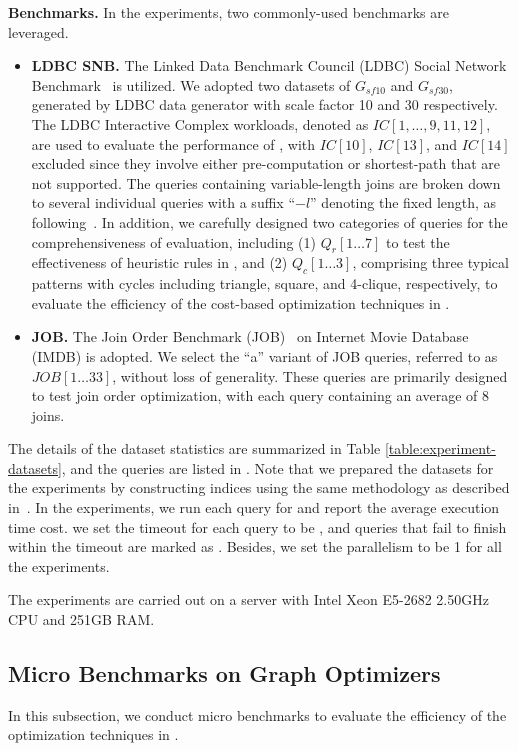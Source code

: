 \noindent\textbf{Benchmarks.} In the experiments, two commonly-used benchmarks are leveraged.
\begin{itemize}
    \item \textbf{LDBC SNB.} The Linked Data Benchmark Council (LDBC) Social Network Benchmark~\cite{ldbc_snb} is utilized. We adopted two datasets of $G_{sf10}$ and $G_{sf30}$, generated by LDBC data generator with scale factor 10 and 30 respectively.
    The LDBC Interactive Complex workloads, denoted as  $IC[1, \ldots, 9, 11, 12]$, are used to evaluate the performance of \relgo, with $IC[10]$, $IC[13]$, and $IC[14]$ excluded since they involve either pre-computation or shortest-path that are not supported.
    The queries containing variable-length joins are broken down to several individual queries with a suffix ``$-l$'' denoting the fixed length, as following~\cite{graindb}.
    In addition, we carefully designed two categories of queries for the comprehensiveness of evaluation, including (1) $Q_r[1\ldots 7]$ to test the effectiveness of heuristic rules in \relgo, and (2) $Q_c[1\ldots 3]$, comprising three typical patterns with cycles including triangle, square, and 4-clique, respectively, to evaluate the efficiency of the cost-based optimization techniques in \relgo.
    \item \textbf{JOB.} The Join Order Benchmark (JOB)~\cite{job_snb} on Internet Movie Database (IMDB) is adopted. We select the ``a'' variant of JOB queries, referred to as $JOB[1\ldots 33]$, without loss of generality. These queries are primarily designed to test join order optimization, with each query containing an average of $8$ joins.
\end{itemize}
The details of the dataset statistics are summarized in Table \ref{table:experiment-datasets}, and the queries are listed in .
Note that we prepared the datasets for the experiments by constructing indices using the same methodology as described in~\cite{graindb}.
In the experiments, we run each query for  and report the average execution time cost.
we set the timeout for each query to be , and queries that fail to finish within the timeout are marked as \ot.
Besides, we set the parallelism to be 1 for all the experiments.

The experiments are carried out on a server with Intel Xeon E5-2682 2.50GHz CPU and 251GB RAM.

\subsection{Micro Benchmarks on Graph Optimizers}
\label{sec:experiment-opt}
In this subsection, we conduct micro benchmarks to evaluate the efficiency of the optimization techniques in \relgo.

